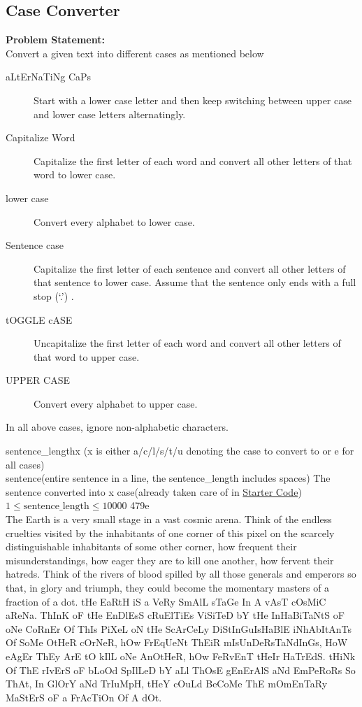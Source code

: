 \documentclass[../../Problems]{subfiles}
\begin{document}
{\scriptsize
\subsection{Case Converter}
\textbf{Problem Statement:}\\
Convert a given text into different cases as mentioned below
\begin{description}
	\item[aLtErNaTiNg CaPs] Start with a lower case letter and then keep switching between upper case and lower case letters alternatingly.
	\item[Capitalize Word] Capitalize the first letter of each word and convert all other letters of that word to lower case.
	\item[lower case] Convert every alphabet to lower case.
	\item[Sentence case] Capitalize the first letter of each sentence and convert all other letters of that sentence to lower case. Assume that the sentence only ends with a full stop (`.') .
	\item[tOGGLE cASE] Uncapitalize the first letter of each word and convert all other letters of that word to upper case.
	\item[UPPER CASE] Convert every alphabet to upper case.
\end{description}
\begin{note}
	In all above cases, ignore non-alphabetic characters.
\end{note}
\begin{testcases}
	{sentence\_length\quad x \hfill(x is either a/c/l/s/t/u denoting the case to convert to or e for all cases)\\
	sentence\hfill(entire sentence in a line, the sentence\_length includes spaces)}
	{The sentence converted into x case\hfill{(already taken care of in \href{https://github.com/paramrathour/CS-101/tree/main/Starter Codes/Case Converter.cpp}{Starter Code})}}
	{$1 \leq \text{sentence\_length} \leq 10000$}
	{479\quad e\\The Earth is a very small stage in a vast cosmic arena. Think of the endless cruelties visited by the inhabitants of one corner of this pixel on the scarcely distinguishable inhabitants of some other corner, how frequent their misunderstandings, how eager they are to kill one another, how fervent their hatreds. Think of the rivers of blood spilled by all those generals and emperors so that, in glory and triumph, they could become the momentary masters of a fraction of a dot.}
	{tHe EaRtH iS a VeRy SmAlL sTaGe In A vAsT cOsMiC aReNa. ThInK oF tHe EnDlEsS cRuElTiEs ViSiTeD bY tHe InHaBiTaNtS oF oNe CoRnEr Of ThIs PiXeL oN tHe ScArCeLy DiStInGuIsHaBlE iNhAbItAnTs Of SoMe OtHeR cOrNeR, hOw FrEqUeNt ThEiR mIsUnDeRsTaNdInGs, HoW eAgEr ThEy ArE tO kIlL oNe AnOtHeR, hOw FeRvEnT tHeIr HaTrEdS. tHiNk Of ThE rIvErS oF bLoOd SpIlLeD bY aLl ThOsE gEnErAlS aNd EmPeRoRs So ThAt, In GlOrY aNd TrIuMpH, tHeY cOuLd BeCoMe ThE mOmEnTaRy MaStErS oF a FrAcTiOn Of A dOt.\\\\
}
\end{testcases}}
\end{document}
